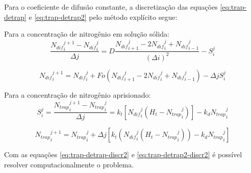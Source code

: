 Para o coeficiente de difusão constante, a discretização das equações \autoref{eq:trap-detrap} e \autoref{eq:trap-detrap2} pelo método explícito segue:

Para a concentração de nitrogênio em solução sólida:
\begin{equation*}
\dfrac{{N_{dif}}_{i}^{j+1} - {N_{dif}}_{i}^{j}}{\Delta j} = D \dfrac{{N_{dif}}_{i+1}^{j} - 2{N_{dif}}_i^{j} + {N_{dif}}_{i-1}^{j}}{(\Delta i)^2} - S_i^j
\end{equation*} 

\begin{equation}
\label{eq:trap-detrap-discr2}
{N_{dif}}_{i}^{j+1} = {N_{dif}}_{i}^{j} + Fo({N_{dif}}_{i+1}^{j} - 2{N_{dif}}_i^{j} + {N_{dif}}_{i-1}^{j}) - {\Delta j} S_i^j
\end{equation} 


Para a concentração de nitrogênio aprisionado:
\begin{equation*}
S_i^j = \dfrac{{N_{trap}}_i^{j+1} - {N_{trap}}_{i}^{j}}{\Delta j} = k_t\left[{N_{dif}}_{i}^{j} \left(H_t-{N_{trap}}_{i}^{j}\right)\right] - k_d{N_{trap}}_i^{j}
\end{equation*}


\begin{equation}
\label{eq:trap-detrap2-discr2}
{N_{trap}}_i^{j+1} = {N_{trap}}_{i}^{j} + {\Delta j}\left[k_t\left({N_{dif}}_{i}^{j} \left(H_t-{N_{trap}}_{i}^{j}\right)\right) - k_d{N_{trap}}_i^{j}\right]
\end{equation}


Com as equações \autoref{eq:trap-detrap-discr2} e \autoref{eq:trap-detrap2-discr2} é possível resolver computacionalmente o problema.